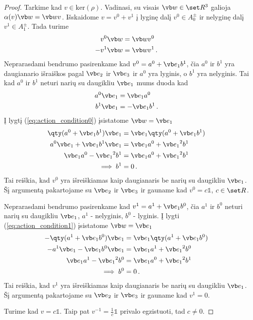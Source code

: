 \begin{proof}
	Tarkime kad $v \in \mathup{ker}(\rho)$.
	Vadinasi, su visais $\vb w \in \set R^3$ galioja
	$\alpha(v)\vb w = \vb w v$.
	Išskaidome $v = v^0 + v^1$ į lyginę dalį $v^0 \in A^\pm_0$
	ir nelyginę dalį $v^1 \in A^\pm_1$.
	Tada turime
	\begin{align}
		\label{eq:action_condition0}
		v^0\vb w &= \vb w v^0
		\\
		\label{eq:action_condition1}
		- v^1\vb w &= \vb w v^1
		\,.
	\end{align}
	Neprarasdami bendrumo pasirenkame kad $v^0 = a^0 + \vb e_1 b^1$,
	čia $a^0$ ir $b^1$ yra daugianario išraiškos pagal $\vb e_2$ ir $\vb e_3$
	ir $a^0$ yra lyginis, o $b^1$ yra nelyginis.
	Tai kad $a^0$ ir $b^1$ neturi narių su daugikliu $\vb e_1$ mums duoda kad
	\begin{align}
		a^0\vb e_1 &= \vb e_1 a^0
		\\
		b^1\vb e_1 &= -\vb e_1 b^1
		\,.
	\end{align}
	Į lygtį (\ref{eq:action_condition0}) įsistatome $\vb w = \vb e_1$
	\begin{equation}
		\begin{aligned}
			\qty(a^0 + \vb e_1 b^1)\vb e_1 
			&= \vb e_1 \qty(a^0 + \vb e_1 b^1)
			\\
			a^0\vb e_1 + \vb e_1 b^1 \vb e_1
			&= \vb e_1 a^0 + {\vb e_1}^2 b^1
			\\
			\vb e_1 a^0 - {\vb e_1}^2 b^1 
			&= \vb e_1 a^0 + {\vb e_1}^2 b^1
			\\
			\implies b^1 &= 0
			\,.
		\end{aligned}
	\end{equation}
	Tai reiškia, kad $v^0$ yra išreiškiamas kaip daugianaris
	be narių su daugikliu $\vb e_1$.
	Šį argumentą pakartojame su $\vb e_2$ ir $\vb e_3$
	ir gauname kad $v^0 = c \mathbb1 $, $c \in \set R$.

	Neprarasdami bendrumo pasirenkame kad $v^1 = a^1 + \vb e_1 b^0$,
	čia $a^1$ ir $b^0$ neturi narių su daugikliu $\vb e_1$,
	$a^1$ - nelyginis, $b^0$ - lyginis.
	Į lygti (\ref{eq:action_condition1}) įsistatome $\vb w = \vb e_1$
	\begin{equation}
		\begin{aligned}
			-\qty(a^1 + \vb e_1 b^0)\vb e_1 
			&= \vb e_1 \qty(a^1 + \vb e_1 b^0)
			\\
			-a^1\vb e_1 - \vb e_1 b^0 \vb e_1
			&= \vb e_1 a^1 + {\vb e_1}^2 b^0
			\\
			\vb e_1 a^1 - {\vb e_1}^2 b^0 
			&= \vb e_1 a^0 + {\vb e_1}^2 b^1
			\\
			\implies b^0 &= 0
			\,.
		\end{aligned}
	\end{equation}
	Tai reiškia, kad $v^1$ yra išreiškiamas kaip daugianaris
	be narių su daugikliu $\vb e_1$.
	Šį argumentą pakartojame su $\vb e_2$ ir $\vb e_3$
	ir gauname kad $v^1 = 0 $.

	Turime kad $v = c \mathbb1$.
	Taip pat $v^{-1} = \frac{1}{c} \mathbb1$ privalo egzistuoti,
	tad $c \neq 0$.
\end{proof}

